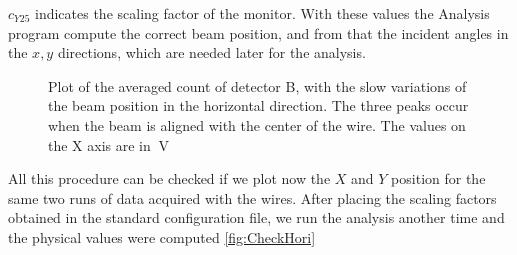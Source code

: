$c_{Y25}$ indicates the scaling factor of the monitor. With these values the Analysis program compute the correct beam position, and from that the incident angles in the $x,y$ directions, which are needed later for the analysis.

\begin{figure}[hbtp]
\centering
{}
\caption{Plot of the averaged count of detector B, with the slow variations of the beam position in the horizontal direction. The three peaks occur when the beam is aligned with the center of the wire. The values on the X axis are in $\SI{}{\volt}$}
\label{fig:HorizontalCalibration}
\end{figure}

All this procedure can be  checked if we plot now the $X$ and $Y$ position for the same two runs of data acquired with the wires. After placing the scaling factors obtained in the standard configuration file, we run the analysis another time and the physical values were computed \ref{fig:CheckHori}

